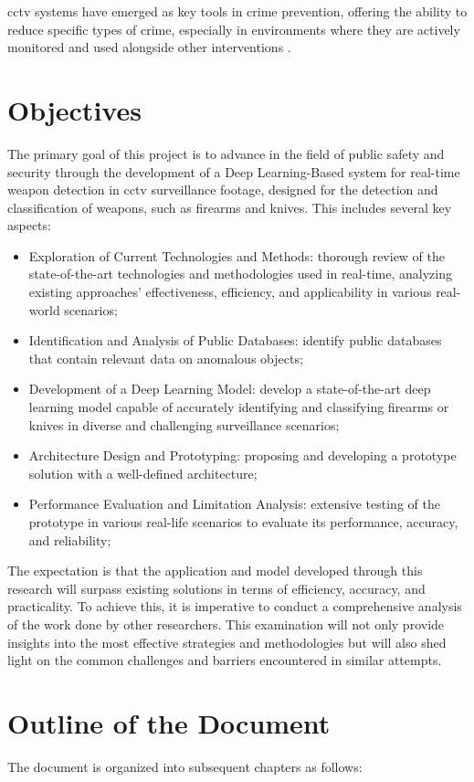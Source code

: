 \ac{cctv} systems have emerged as key tools in crime prevention, offering the ability to reduce specific types of crime, especially in environments where they are actively monitored and used alongside other interventions \cite{rfc35}. 
\section{Objectives}
The primary goal of this project is to advance in the field of public safety and security through the development of a Deep Learning-Based system for real-time weapon detection in \ac{cctv} surveillance footage, designed for the detection and classification of weapons, such as firearms and knives. This includes several key aspects:
\begin{itemize}
    \item Exploration of Current Technologies and Methods: thorough review of the state-of-the-art technologies and methodologies used in real-time, analyzing existing approaches' effectiveness, efficiency, and applicability in various real-world scenarios;
    \item Identification and Analysis of Public Databases: identify public databases that contain relevant data on anomalous objects;
    \item Development of a Deep Learning Model: develop a state-of-the-art deep learning model capable of accurately identifying and classifying firearms or knives in diverse and challenging surveillance scenarios;
    \item Architecture Design and Prototyping: proposing and developing a prototype solution with a well-defined architecture;
    \item Performance Evaluation and Limitation Analysis: extensive testing of the prototype in various real-life scenarios to evaluate its performance, accuracy, and reliability;
\end{itemize}

The expectation is that the application and model developed through this research will surpass existing solutions in terms of efficiency, accuracy, and practicality. To achieve this, it is imperative to conduct a comprehensive analysis of the work done by other researchers. This examination will not only provide insights into the most effective strategies and methodologies but will also shed light on the common challenges and barriers encountered in similar attempts.  
\section{Outline of the Document}
The document is organized into subsequent chapters as follows: 

